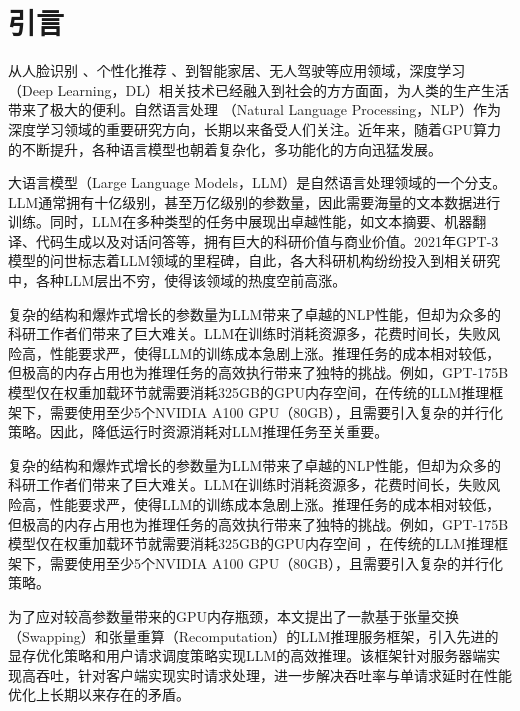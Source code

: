 \section{引言}

从人脸识别 \cite{Face-Recognition}、个性化推荐 \cite{Personal-Recommendation}、到智能家居\cite{Smart-Home}、无人驾驶\cite{Self-Driving-Car}等应用领域，深度学习 \cite{Deep-Learning}（Deep Learning，DL）相关技术已经融入到社会的方方面面，为人类的生产生活带来了极大的便利。自然语言处理 \cite{NLP}（Natural Language Processing，NLP）作为深度学习领域的重要研究方向，长期以来备受人们关注。近年来，随着GPU算力的不断提升，各种语言模型也朝着复杂化，多功能化的方向迅猛发展。 \par

大语言模型\cite{LLM}（Large Language Models，LLM）是自然语言处理领域的一个分支。LLM通常拥有十亿级别，甚至万亿级别的参数量，因此需要海量的文本数据进行训练。同时，LLM在多种类型的任务中展现出卓越性能，如文本摘要\cite{Text-Summarization}、机器翻译\cite{Machine-Translation}、代码生成\cite{Code-Generation}以及对话问答\cite{Question-Answer}等，拥有巨大的科研价值与商业价值。2021年GPT-3模型\cite{Text-Summarization, GPT3}的问世标志着LLM领域的里程碑，自此，各大科研机构纷纷投入到相关研究中，各种LLM层出不穷，使得该领域的热度空前高涨。 \par

复杂的结构和爆炸式增长的参数量为LLM带来了卓越的NLP性能，但却为众多的科研工作者们带来了巨大难关。LLM在训练时消耗资源多，花费时间长，失败风险高，性能要求严，使得LLM的训练成本急剧上涨。推理任务的成本相对较低，但极高的内存占用也为推理任务的高效执行带来了独特的挑战。例如，GPT-175B模型仅在权重加载环节就需要消耗325GB的GPU内存空间\cite{GPT-175B资源消耗}，在传统的LLM推理框架下，需要使用至少5个NVIDIA A100 GPU（80GB），且需要引入复杂的并行化策略。因此，降低运行时资源消耗对LLM推理任务至关重要。\par

复杂的结构和爆炸式增长的参数量为LLM带来了卓越的NLP性能，但却为众多的科研工作者们带来了巨大难关。LLM在训练时消耗资源多，花费时间长，失败风险高，性能要求严，使得LLM的训练成本急剧上涨。推理任务的成本相对较低，但极高的内存占用也为推理任务的高效执行带来了独特的挑战。例如，GPT-175B模型仅在权重加载环节就需要消耗325GB的GPU内存空间 ，在传统的LLM推理框架下，需要使用至少5个NVIDIA A100 GPU（80GB），且需要引入复杂的并行化策略。\par

为了应对较高参数量带来的GPU内存瓶颈，本文提出了一款基于张量交换\cite{Swapping}（Swapping）和张量重算\cite{Recomputation}（Recomputation）的LLM推理服务框架，引入先进的显存优化策略和用户请求调度策略实现LLM的高效推理。该框架针对服务器端实现高吞吐，针对客户端实现实时请求处理，进一步解决吞吐率与单请求延时在性能优化上长期以来存在的矛盾。 \par

